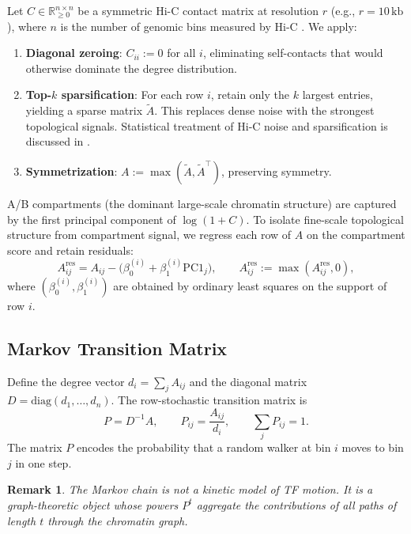 \documentclass[11pt,a4paper]{article}
\newtheorem{remark}{Remark}
\begin{document}
Let $C \in \mathbb{R}_{\geq 0}^{n \times n}$ be a symmetric Hi-C contact matrix at resolution $r$ (e.g., $r = 10\,\mathrm{kb}$), where $n$ is the number of genomic bins  measured by Hi-C \cite{dekker2013,rao2014}. We apply:
\begin{enumerate}
    \item \textbf{Diagonal zeroing}: $C_{ii} := 0$ for all $i$, eliminating self-contacts that would otherwise dominate the degree distribution.
    \item \textbf{Top-$k$ sparsification}: For each row $i$, retain only the $k$ largest entries, yielding a sparse matrix $\tilde{A}$. This replaces dense noise with the strongest topological signals. Statistical treatment of Hi-C noise and sparsification is discussed
in \cite{hu2013}.
    \item \textbf{Symmetrization}: $A := \max(\tilde{A}, \tilde{A}^\top)$, preserving symmetry.
\end{enumerate}

A/B compartments (the dominant large-scale chromatin structure) are captured by the first principal component of $\log(1+C)$. To isolate fine-scale topological structure from compartment signal, we regress each row of $A$ on the compartment score and retain residuals:
\begin{equation}
A_{ij}^{\mathrm{res}} = A_{ij} - \big(\beta_0^{(i)} + \beta_1^{(i)} \mathrm{PC1}_j\big), \qquad A_{ij}^{\mathrm{res}} := \max(A_{ij}^{\mathrm{res}}, 0),
\end{equation}
where $(\beta_0^{(i)}, \beta_1^{(i)})$ are obtained by ordinary least squares on the support of row $i$.

\subsection{Markov Transition Matrix}

Define the degree vector $d_i = \sum_j A_{ij}$ and the diagonal matrix $D = \mathrm{diag}(d_1, \dots, d_n)$. The row-stochastic transition matrix is
\begin{equation}
P = D^{-1} A, \qquad P_{ij} = \frac{A_{ij}}{d_i}, \qquad \sum_j P_{ij} = 1.
\end{equation}
The matrix $P$ encodes the probability that a random walker at bin $i$ moves to bin $j$ in one step.

\begin{remark}
The Markov chain is \emph{not} a kinetic model of TF motion. It is a graph-theoretic object whose powers $P^t$ aggregate the contributions of all paths of length $t$ through the chromatin graph.
\end{remark}
\end{document}
